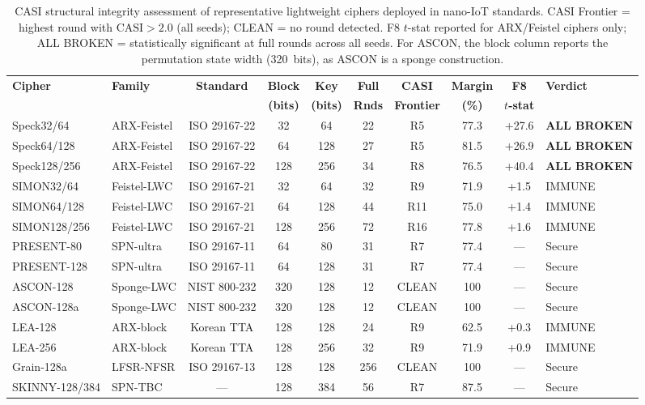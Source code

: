 \documentclass[conference]{IEEEtran}
\begin{document}
\begin{table}[t]
\centering
\caption{CASI structural integrity assessment of representative lightweight ciphers deployed in nano-IoT standards. CASI Frontier = highest round with $\text{CASI} > 2.0$ (all seeds); CLEAN = no round detected. F8 $t$-stat reported for ARX/Feistel ciphers only; ALL BROKEN = statistically significant at full rounds across all seeds. For ASCON, the block column reports the permutation state width (320~bits), as ASCON is a sponge construction.}
\label{tab:main}
\small
\begin{tabular}{@{}llcccccccl@{}}
\toprule
\textbf{Cipher} & \textbf{Family} & \textbf{Standard} & \textbf{Block} & \textbf{Key} & \textbf{Full} & \textbf{CASI} & \textbf{Margin} & \textbf{F8} & \textbf{Verdict} \\
 & & & \textbf{(bits)} & \textbf{(bits)} & \textbf{Rnds} & \textbf{Frontier} & \textbf{(\%)} & $t$\textbf{-stat} & \\
\midrule
Speck32/64     & ARX-Feistel  & ISO 29167-22  & 32  & 64  & 22 & R5  & 77.3 & +27.6 & \textbf{ALL BROKEN} \\
Speck64/128    & ARX-Feistel  & ISO 29167-22  & 64  & 128 & 27 & R5  & 81.5 & +26.9 & \textbf{ALL BROKEN} \\
Speck128/256   & ARX-Feistel  & ISO 29167-22  & 128 & 256 & 34 & R8  & 76.5 & +40.4 & \textbf{ALL BROKEN} \\
\midrule
SIMON32/64     & Feistel-LWC  & ISO 29167-21  & 32  & 64  & 32 & R9  & 71.9 & +1.5  & IMMUNE \\
SIMON64/128    & Feistel-LWC  & ISO 29167-21  & 64  & 128 & 44 & R11 & 75.0 & +1.4  & IMMUNE \\
SIMON128/256   & Feistel-LWC  & ISO 29167-21  & 128 & 256 & 72 & R16 & 77.8 & +1.6  & IMMUNE \\
\midrule
PRESENT-80     & SPN-ultra    & ISO 29167-11  & 64  & 80  & 31 & R7  & 77.4 & ---   & Secure \\
PRESENT-128    & SPN-ultra    & ISO 29167-11  & 64  & 128 & 31 & R7  & 77.4 & ---   & Secure \\
\midrule
ASCON-128      & Sponge-LWC   & NIST 800-232  & 320 & 128 & 12 & CLEAN & 100 & ---   & Secure \\
ASCON-128a     & Sponge-LWC   & NIST 800-232  & 320 & 128 & 12 & CLEAN & 100 & ---   & Secure \\
\midrule
LEA-128        & ARX-block    & Korean TTA    & 128 & 128 & 24 & R9  & 62.5 & +0.3  & IMMUNE \\
LEA-256        & ARX-block    & Korean TTA    & 128 & 256 & 32 & R9  & 71.9 & +0.9  & IMMUNE \\
\midrule
Grain-128a     & LFSR-NFSR    & ISO 29167-13  & 128 & 128 & 256 & CLEAN & 100 & ---  & Secure \\
\midrule
SKINNY-128/384 & SPN-TBC      & ---           & 128 & 384 & 56 & R7  & 87.5 & ---   & Secure \\
\bottomrule
\end{tabular}
\end{table}
\end{document}
